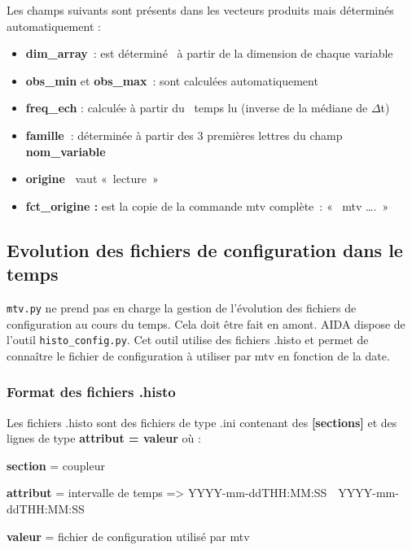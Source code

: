 {\medskip
Les champs suivants sont présents dans les vecteurs produits mais déterminés automatiquement :

\medskip
\begin{itemize}
\item \textbf{dim\_array}~: est déterminé \ à partir de la dimension de chaque variable 
\item \textbf{obs\_min }et \textbf{obs\_max}~: sont calculées automatiquement
\item \textbf{freq\_ech} : calculée à partir du \ temps lu (inverse de la médiane de \texttt{${\Delta}$}t)
\item \textbf{famille}\textbf{~}: déterminée à partir des 3 premières lettres du champ \textbf{nom\_variable}
\item \textbf{origine~ }vaut «~lecture~»
\item \textbf{fct\_origine : }est la copie de la commande mtv complète~: «~ mtv {\dots}.~»
\end{itemize}


\subsection{Evolution des fichiers de configuration dans le temps}
\label{sec:histo_config}
\texttt{mtv.py} ne prend pas en charge la gestion de l'évolution des fichiers
de configuration au cours du temps. Cela doit être fait en amont. AIDA dispose de
l'outil \texttt{histo\_config.py}. Cet outil utilise des fichiers .histo et
permet de connaître le fichier de configuration à utiliser par mtv en fonction de la
date.

\medskip
\subsubsection{Format des fichiers .histo}
Les fichiers .histo sont des fichiers de type .ini contenant des {\bfseries [sections]} et des lignes de type {\bfseries attribut = valeur} où :

{\bfseries section} = coupleur

{\bfseries attribut} = intervalle de temps => YYYY-mm-ddTHH:MM:SS~~YYYY-mm-ddTHH:MM:SS

{\bfseries valeur} = fichier de configuration utilisé par mtv

}
